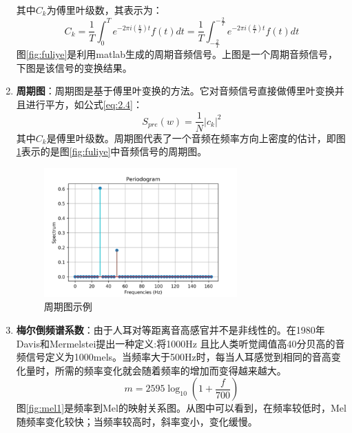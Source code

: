 \begin{enumerate}
    其中\(C_k\)为傅里叶级数，其表示为：
    \begin{equation}
        C_k  = \frac{1}{T}\int_{0}^{T} e^{-2\pi i(\frac{k}{T})t}f(t) d t
        = \frac{1}{T}\int_{-\frac{2}{T}}^{-\frac{2}{T}} e^{-2\pi i(\frac{k}{T})t}f(t) d t
    \end{equation}
    图\ref{fig:fuliye}是利用matlab生成的周期音频信号。上图是一个周期音频信号，下图是该信号的变换结果。

    \item \textbf{周期图}：周期图是基于傅里叶变换的方法。它对音频信号直接做傅里叶变换并且进行平方，如公式\ref{eq:2.4}：
        \begin{equation}
            S_{pre}(w) = \frac{1}{N}|c_k|^2
            \label{eq:2.4}
        \end{equation}
    其中\(C_k\)是傅里叶级数。周期图代表了一个音频在频率方向上密度的估计，即图\ref{fig:zhouqitu}表示的是图\ref{fig:fuliye}中音频信号的周期图。
    \begin{figure}[h]
      \centering
      \includegraphics[width=0.7\textwidth]{figures/周期图图片.png}
      \caption{周期图示例}
      \label{fig:zhouqitu}
    \end{figure}
    \item \textbf{梅尔倒频谱系数}：由于人耳对等距离音高感官并不是非线性的。在1980年Davis和Mermelstei\cite{zheng2001comparison}提出一种定义:将1000Hz 且比人类听觉阈值高40分贝高的音频信号定义为1000mels。当频率大于500Hz时，每当人耳感觉到相同的音高变化量时，所需的频率变化就会随着频率的增加而变得越来越大。 
            \begin{equation}
            m = 2595\log_{10}{(1+\frac{f}{700})}
            \label{eq:2.4}
        \end{equation}
    图\ref{fig:mel1}是频率到Mel的映射关系图。从图中可以看到，在频率较低时，Mel随频率变化较快；当频率较高时，斜率变小，变化缓慢\cite{zheng2001comparison}。
     \begin{figure}[h]

\end{figure}
\end{enumerate}
